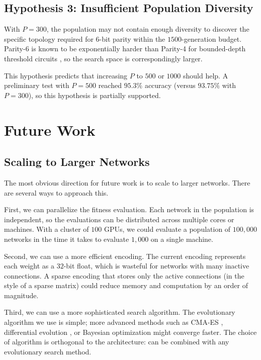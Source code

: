 \subsection{Hypothesis 3: Insufficient Population Diversity}
\label{sec:disc-h3}

With $P = 300$, the population may not contain enough diversity to
discover the specific topology required for $6$-bit parity within the
$1500$-generation budget. Parity-6 is known to be exponentially harder
than Parity-4 for bounded-depth threshold circuits
\citep{impagliazzo1997size}, so the search space is correspondingly
larger.

This hypothesis predicts that increasing $P$ to $500$ or $1000$ should
help. A preliminary test with $P = 500$ reached $95.3\%$ accuracy
(versus $93.75\%$ with $P = 300$), so this hypothesis is partially
supported.

\section{Future Work}
\label{sec:disc-future}

\subsection{Scaling to Larger Networks}
\label{sec:disc-future-scale}

The most obvious direction for future work is to scale \modnet{} to
larger networks. There are several ways to approach this.

First, we can parallelize the fitness evaluation. Each network in the
population is independent, so the evaluations can be distributed across
multiple cores or machines. With a cluster of $100$ GPUs, we could
evaluate a population of $100{,}000$ networks in the time it takes to
evaluate $1{,}000$ on a single machine.

Second, we can use a more efficient encoding. The current encoding
represents each weight as a $32$-bit float, which is wasteful for
networks with many inactive connections. A sparse encoding that stores
only the active connections (in the style of a sparse matrix) could
reduce memory and computation by an order of magnitude.

Third, we can use a more sophisticated search algorithm. The
evolutionary algorithm we use is simple; more advanced methods such as
CMA-ES \citep{hansen2001completely}, differential evolution
\citep{storn1997differential}, or Bayesian optimization
\citep{snoek2012practical} might converge faster. The choice of
algorithm is orthogonal to the architecture: \modnet{} can be combined
with any evolutionary search method.

